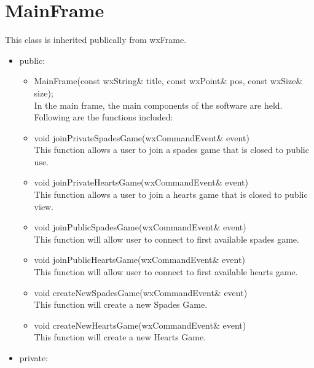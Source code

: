 \documentclass[]{scrartcl}
\begin{document}
\section{MainFrame}
	This class is inherited publically from wxFrame.

	\begin{itemize}
		\item public:

		\begin{itemize}
			\item MainFrame(const wxString\& title, const wxPoint\& pos, const wxSize\& size);
				\\ In the main frame, the main components of the software are held. Following are the functions included:

			\item void joinPrivateSpadesGame(wxCommandEvent\& event) {}
				\\This function allows a user to join a spades game that is closed to public use.

			\item void joinPrivateHeartsGame(wxCommandEvent\& event) {}
				\\ This function allows a user to join a hearts game that is closed to public view.

			\item void joinPublicSpadesGame(wxCommandEvent\& event) {}
				\\ This function will allow user to connect to first available spades game.

			\item void joinPublicHeartsGame(wxCommandEvent\& event) {}
				\\ This function will allow user to connect to first available hearts game.

			\item void createNewSpadesGame(wxCommandEvent\& event) {}
				\\	This function will create a new Spades Game.

			\item void createNewHeartsGame(wxCommandEvent\& event) {}
				\\ This function will create a new Hearts Game.

		\end{itemize}

		\item 	private:


\end{itemize}
\end{document}
